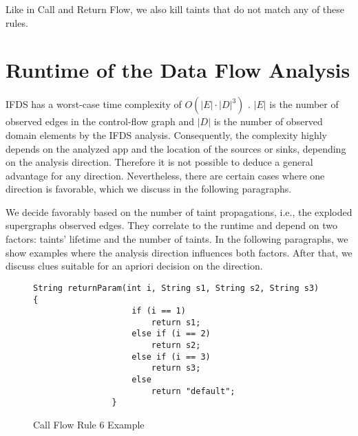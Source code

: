 \documentclass[../draft.tex]{subfiles}
\begin{document}
    Like in Call and Return Flow, we also kill taints that do not match any of these rules.

    \section{Runtime of the Data Flow Analysis}\label{s:complexity}
    IFDS has a worst-case time complexity of $O(|E| \cdot |D|^3)$ \cite{Reps1995}. $|E|$ is the number of observed edges in the control-flow graph and $|D|$ is the number of observed domain elements by the IFDS analysis.
    Consequently, the complexity highly depends on the analyzed app and the location of the sources or sinks, depending on the analysis direction.
    Therefore it is not possible to deduce a general advantage for any direction.
    Nevertheless, there are certain cases where one direction is favorable, which we discuss in the following paragraphs.

    We decide favorably based on the number of taint propagations, i.e., the exploded supergraphs observed edges.
    They correlate to the runtime and depend on two factors: taints' lifetime and the number of taints.
    In the following paragraphs, we show examples where the analysis direction influences both factors.
    After that, we discuss clues suitable for an apriori decision on the direction.

    \begin{figure}[tbp]
        \centering
        \begin{adjustbox}{max width=\textwidth}
            \begin{lstlisting}[gobble=16]
                String returnParam(int i, String s1, String s2, String s3) {
                    if (i == 1)
                        return s1;
                    else if (i == 2)
                        return s2;
                    else if (i == 3)
                        return s3;
                    else
                        return "default";
                }
            \end{lstlisting}
        \end{adjustbox}
        \caption{Call Flow Rule 6 Example}
        \label{lst:branching}
    \end{figure}
\end{document}
